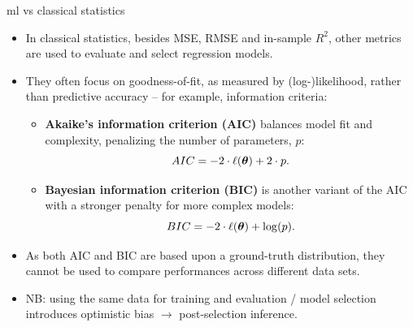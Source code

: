 \begin{vbframe}{ml vs classical statistics}

\small

\begin{itemize}
  \item In classical statistics, besides MSE, RMSE and in-sample $R^2$, other 
  metrics are used to evaluate and select regression models. 
  \item They often focus on goodness-of-fit, as measured by (log-)likelihood, 
  rather than predictive accuracy -- for example, information criteria:
  \begin{itemize}
    \small
    \item \textbf{Akaike’s information criterion (AIC)} balances model fit and
    complexity, penalizing the number of parameters, $p$: 
    $$ AIC = -2 \cdot \ell(\bm{\theta}) + 2 \cdot p.$$
    
    
    \item \textbf{Bayesian information criterion (BIC)} is another variant of 
    the AIC with a stronger penalty for more complex models: 
    $$ BIC = -2 \cdot \ell(\bm{\theta}) + \log(p).$$
  \end{itemize}
    
    
  \item As both AIC and BIC are based upon a ground-truth distribution, they 
  cannot be used to compare performances across different data sets.
  \item NB: using the same data for training and evaluation / model selection 
  introduces optimistic bias $\rightarrow$ post-selection inference.
    
 \end{itemize}

\end{vbframe}


\endlecture
